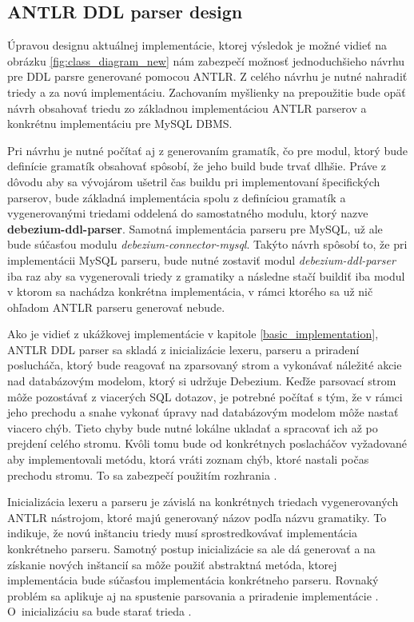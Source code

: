 \subsection{ANTLR DDL parser design}
Úpravou designu aktuálnej implementácie, ktorej výsledok je možné vidieť na obrázku \ref{fig:class_diagram_new} nám zabezpečí možnosť jednoduchšieho návrhu pre DDL parsre generované pomocou \mbox{ANTLR}. Z celého návrhu je nutné nahradiť triedy  a  za novú implementáciu. Zachovaním myšlienky na prepoužitie bude opäť návrh obsahovať triedu zo základnou implementáciou ANTLR parserov a konkrétnu implementáciu pre MySQL DBMS.

Pri návrhu je nutné počítať aj z generovaním gramatík, čo pre modul, ktorý bude definície gramatík obsahovať spôsobí, že jeho build bude trvať dlhšie. Práve z dôvodu aby sa vývojárom ušetril čas buildu pri implementovaní špecifických parserov, bude základná implementácia spolu z definíciou gramatík a vygenerovanými triedami oddelená do samostatného modulu, ktorý nazve \textbf{debezium-ddl-parser}. Samotná implementácia parseru pre MySQL, už ale bude súčasťou modulu \textit{debezium-connector-mysql}. Takýto návrh spôsobí to, že pri implementácii MySQL parseru, bude nutné zostaviť modul \textit{debezium-ddl-parser} iba raz aby sa vygenerovali triedy z gramatiky a následne stačí buildiť iba modul v ktorom sa nachádza konkrétna implementácia, v rámci ktorého sa už nič ohľadom ANTLR parseru generovať nebude.

Ako je vidieť z ukážkovej implementácie v kapitole \ref{basic_implementation}, ANTLR DDL parser sa skladá z inicializácie lexeru, parseru a priradení poslucháča, ktorý bude reagovať na zparsovaný strom a vykonávať náležité akcie nad databázovým modelom, ktorý si udržuje Debezium. 
Keďže parsovací strom môže pozostávať z viacerých SQL dotazov, je potrebné počítať s tým, že v rámci jeho prechodu a snahe vykonať úpravy nad databázovým modelom môže nastať viacero chýb. Tieto chyby bude nutné lokálne ukladať a spracovať ich až po prejdení celého stromu. Kvôli tomu bude od konkrétnych poslacháčov vyžadované aby implementovali metódu, ktorá vráti zoznam chýb, ktoré nastali počas prechodu stromu. To sa zabezpečí použitím rozhrania . 

Inicializácia lexeru a parseru je závislá na konkrétnych triedach vygenerovaných ANTLR nástrojom, ktoré majú generovaný názov podľa názvu gramatiky. To indikuje, že novú inštanciu triedy musí sprostredkovávať implementácia konkrétneho parseru. Samotný postup inicializácie sa ale dá generovať a na získanie nových inštancií sa môže použiť abstraktná metóda, ktorej implementácia bude súčasťou implementácia konkrétneho parseru. Rovnaký problém sa aplikuje aj na spustenie parsovania a priradenie implementácie . \mbox{O inicializáciu} sa bude starať trieda .

